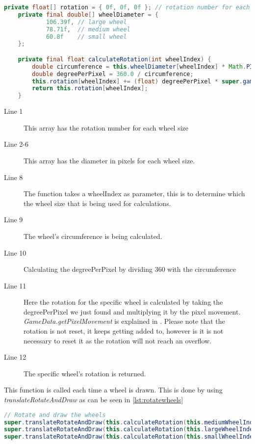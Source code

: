 \begin{lstlisting}[language=java,firstnumber=1,caption={Rotating and drawing the wheels},label=lst:calcrotate]
    private float[] rotation = { 0f, 0f, 0f }; // rotation number for each wheel size
    private final double[] wheelDiameter = {
            106.39f, // large wheel
            78.71f,  // medium wheel
            60.8f    // small wheel
    };

    private final float calculateRotation(int wheelIndex) {    
        double circumference = this.wheelDiameter[wheelIndex] * Math.PI;
        double degreePerPixel = 360.0 / circumference;
        this.rotation[wheelIndex] += (float) degreePerPixel * super.gameData.getPixelMovement();
        return this.rotation[wheelIndex];
    }
\end{lstlisting}

\begin{description}
\item[Line 1] This array has the rotation number for each wheel size
\item[Line 2-6] This array has the diameter in pixels for each wheel size. 
\item[Line 8] The function takes a wheelIndex as parameter, this is to determine which the wheel size that is being used for calculations. 
\item[Line 9] The wheel's circumference is being calculated.
\item[Line 10] Calculating the degreePerPixel by dividing 360 with the circumference
\item[Line 11] Here the rotation for the specific wheel is calculated by taking the degreePerPixel we just found and multiplying it by the pixel movement. \textit{GameData.getPixelMovement} is explained in . Please note that the rotation is not reset, it keeps getting added to, however is it is not necessary to reset it as the rotation will not reach an overflow.
\item[Line 12] The specific wheel's rotation is returned. 
\end{description}

This function is called each time a wheel is drawn. This is done by using \textit{translateRotateAndDraw} as can be seen in \autoref{lst:rotatewheels}

\begin{lstlisting}[language=java,firstnumber=1,caption={Rotating and drawing the wheels},label=lst:rotatewheels]
	// Rotate and draw the wheels
super.translateRotateAndDraw(this.calculateRotation(this.mediumWheelIndex), this.mediumWheel);
super.translateRotateAndDraw(this.calculateRotation(this.largeWheelIndex), this.largeWheel);
super.translateRotateAndDraw(this.calculateRotation(this.smallWheelIndex), this.smallWheel);
\end{lstlisting}

